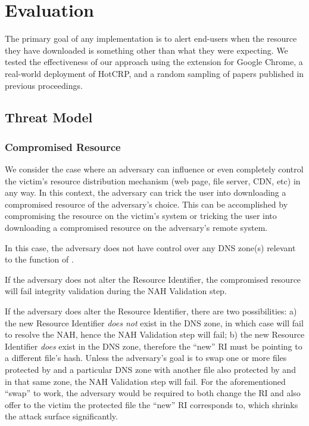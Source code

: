 \section{Evaluation} \label{sec:evaluation}

The primary goal of any \SYSTEM{} implementation is to alert end-users when the
resource they have downloaded is something other than what they were expecting.
We tested the effectiveness of our approach using the \SYSTEM{} extension for
Google Chrome, a real-world deployment of HotCRP, and a random sampling of
papers published in previous \CONFERENCE{} proceedings.

\subsection{Threat Model}

\subsubsection{Compromised Resource}

We consider the case where an adversary can influence or even completely control
the victim's resource distribution mechanism (web page, file server, CDN, etc)
in any way. In this context, the adversary can trick the user into downloading a
compromised resource of the adversary's choice. This can be accomplished by
compromising the resource on the victim's system or tricking the user into
downloading a compromised resource on the adversary's remote system.

In this case, the adversary does not have control over any DNS zone(s) relevant
to the function of \SYSTEM{}.

If the adversary does not alter the Resource Identifier, the compromised
resource will fail integrity validation during the NAH Validation step.

If the adversary does alter the Resource Identifier, there are two
possibilities: a) the new Resource Identifier \textit{does not} exist in the DNS
zone, in which case \SYSTEM{} will fail to resolve the NAH, hence the NAH
Validation step will fail; b) the new Resource Identifier \textit{does} exist in
the DNS zone, therefore the ``new'' RI must be pointing to a different file's
hash. Unless the adversary's goal is to swap one or more files protected by
\SYSTEM{} and a particular DNS zone with another file also protected by
\SYSTEM{} and in that same zone, the NAH Validation step will fail. For the
aforementioned ``swap'' to work, the adversary would be required to both change
the RI and also offer to the victim the \SYSTEM{} protected file the ``new'' RI
corresponds to, which shrinks the attack surface significantly.

